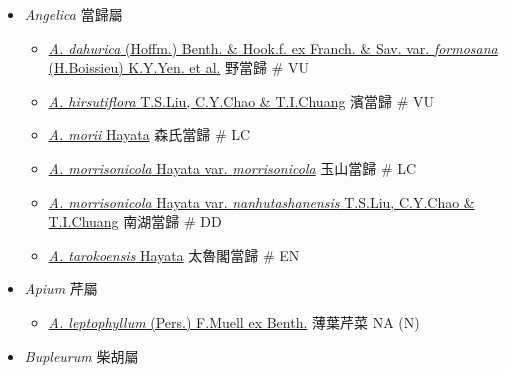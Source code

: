 
  \begin{itemize}
 \item[] \textit{Angelica} 當歸屬
                                
  \begin{itemize}
        \item[] \href{http://www.theplantlist.org/tpl1.1/search?q=Angelica+dahurica+var.+formosana}{\textit{A. dahurica} (Hoffm.) Benth. \& Hook.f. ex Franch. \& Sav. var. \textit{formosana} (H.Boissieu) K.Y.Yen. et al.}   野當歸  \# VU
        \item[] \href{http://www.theplantlist.org/tpl1.1/search?q=Angelica+hirsutiflora}{\textit{A. hirsutiflora} T.S.Liu, C.Y.Chao \& T.I.Chuang}   濱當歸  \# VU
        \item[] \href{http://www.theplantlist.org/tpl1.1/search?q=Angelica+morii}{\textit{A. morii} Hayata}   森氏當歸  \# LC
        \item[] \href{http://www.theplantlist.org/tpl1.1/search?q=Angelica+morrisonicola+var.+morrisonicola}{\textit{A. morrisonicola} Hayata var. \textit{morrisonicola}}   玉山當歸  \# LC
        \item[] \href{http://www.theplantlist.org/tpl1.1/search?q=Angelica+morrisonicola+var.+nanhutashanensis}{\textit{A. morrisonicola} Hayata var. \textit{nanhutashanensis} T.S.Liu, C.Y.Chao \& T.I.Chuang}   南湖當歸  \# DD
        \item[] \href{http://www.theplantlist.org/tpl1.1/search?q=Angelica+tarokoensis}{\textit{A. tarokoensis} Hayata}   太魯閣當歸  \# EN
  \end{itemize}
 \item[] \textit{Apium} 芹屬
                                
  \begin{itemize}
        \item[] \href{http://www.theplantlist.org/tpl1.1/search?q=Apium+leptophyllum}{\textit{A. leptophyllum} (Pers.) F.Muell ex Benth.}   薄葉芹菜   NA (N)
  \end{itemize}
 \item[] \textit{Bupleurum} 柴胡屬
                                

\end{itemize}
